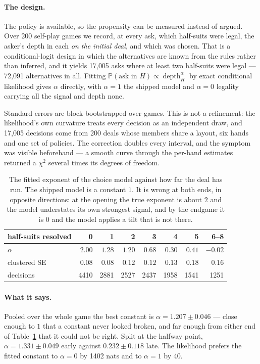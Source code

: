\documentclass[11pt,a4paper]{article}
\newcommand{\Prob}{\ensuremath{\mathbb{P}}}
\begin{document}
\paragraph{The design.} The policy is available, so the propensity can be
measured instead of argued. Over 200 self-play games we record, at every ask,
which half-suits were legal, the asker's depth in each \emph{on the initial
deal}, and which was chosen. That is a conditional-logit design in which the
alternatives are known from the rules rather than inferred, and it yields 17{,}005
asks where at least two half-suits were legal --- 72{,}091 alternatives in all.
Fitting $\Prob(\text{ask in }H) \propto \operatorname{depth}_H^{\alpha}$ by exact
conditional likelihood gives $\alpha$ directly, with $\alpha = 1$ the shipped
model and $\alpha = 0$ legality carrying all the signal and depth none.

Standard errors are block-bootstrapped over games. This is not a refinement: the
likelihood's own curvature treats every decision as an independent draw, and
17{,}005 decisions come from 200 deals whose members share a layout, six hands and
one set of policies. The correction doubles every interval, and the symptom was
visible beforehand --- a smooth curve through the per-band estimates returned a
$\chi^2$ several times its degrees of freedom.

\begin{table}[t]
\centering
\small
\begin{tabular}{lrrrrrrr}
\toprule
half-suits resolved & 0 & 1 & 2 & 3 & 4 & 5 & 6--8 \\
\midrule
$\alpha$          & $2.00$ & $1.28$ & $1.20$ & $0.68$ & $0.30$ & $0.41$ & $-0.02$ \\
clustered SE      & $0.08$ & $0.08$ & $0.12$ & $0.12$ & $0.13$ & $0.18$ & $0.16$ \\
decisions         & 4410 & 2881 & 2527 & 2437 & 1958 & 1541 & 1251 \\
\bottomrule
\end{tabular}
\caption{The fitted exponent of the choice model against how far the deal has
run. The shipped model is a constant $1$. It is wrong at both ends, in opposite
directions: at the opening the true exponent is about $2$ and the model
understates its own strongest signal, and by the endgame it is $0$ and the model
applies a tilt that is not there.}
\label{tab:choicecurve}
\end{table}

\paragraph{What it says.} Pooled over the whole game the best constant is
$\alpha = 1.207 \pm 0.046$ --- close enough to $1$ that a constant never looked
broken, and far enough from either end of Table~\ref{tab:choicecurve} that it
could not be right. Split at the halfway point, $\alpha = 1.331 \pm 0.049$ early
against $0.232 \pm 0.118$ late. The likelihood prefers the fitted constant to
$\alpha = 0$ by 1402 nats and to $\alpha = 1$ by 40.
\end{document}
